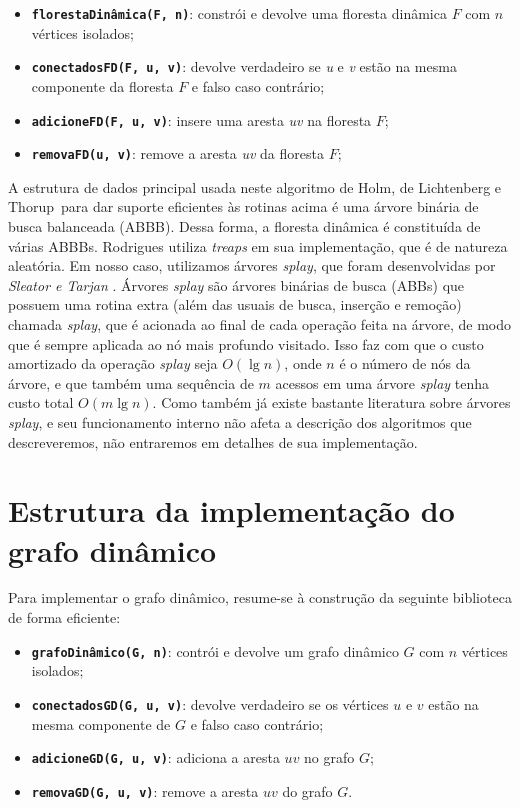 \begin{itemize}
    \item \texttt{\textbf{florestaDinâmica(F, n)}}: constrói e devolve uma floresta dinâmica $F$ com $n$ vértices isolados;
    \item \texttt{\textbf{conectadosFD(F, u, v)}}: devolve verdadeiro se \textit{u} e \textit{v} estão na mesma componente da floresta $F$ e falso caso contrário;
    \item \texttt{\textbf{adicioneFD(F, u, v)}}: insere uma aresta \textit{uv} na floresta $F$;
    \item \texttt{\textbf{removaFD(u, v)}}: remove a aresta \textit{uv} da floresta $F$;
\end{itemize}

A estrutura de dados principal usada neste algoritmo de Holm, de Lichtenberg e Thorup~para dar suporte eficientes às rotinas acima é uma árvore binária de busca balanceada (ABBB). Dessa forma, a floresta dinâmica é constituída de várias ABBBs. Rodrigues utiliza \textit{treaps} em sua implementação, que é de natureza aleatória. Em nosso caso, utilizamos árvores \textit{splay}, que foram desenvolvidas por \textit{Sleator e Tarjan} \cite{sleator}. Árvores \textit{splay} são árvores binárias de busca (ABBs) que possuem uma rotina extra (além das usuais de busca, inserção e remoção) chamada \textit{splay}, que é acionada ao final de cada operação feita na árvore, de modo que é sempre aplicada ao nó mais profundo visitado. Isso faz com que o custo amortizado da operação \textit{splay} seja $O(\lg n)$, onde $n$ é o número de nós da árvore, e que também uma sequência de $m$ acessos em uma árvore \textit{splay} tenha custo total $O(m \lg n)$.  Como também já existe bastante literatura sobre árvores \textit{splay}, e seu funcionamento interno não afeta a descrição dos algoritmos que descreveremos, não entraremos em detalhes de sua implementação.

\section{Estrutura da implementação do grafo dinâmico}

Para implementar o grafo dinâmico, resume-se à construção da seguinte biblioteca de forma eficiente:

\begin{itemize}
    \item \texttt{\textbf{grafoDinâmico(G, n)}}: contrói e devolve um grafo dinâmico $G$ com $n$ vértices isolados;
    \item \texttt{\textbf{conectadosGD(G, u, v)}}: devolve verdadeiro se os vértices $u$ e $v$ estão na mesma componente de $G$ e falso caso contrário;
    \item \texttt{\textbf{adicioneGD(G, u, v)}}: adiciona a aresta $uv$ no grafo $G$;
    \item \texttt{\textbf{removaGD(G, u, v)}}: remove a aresta $uv$ do grafo $G$.
\end{itemize} 

